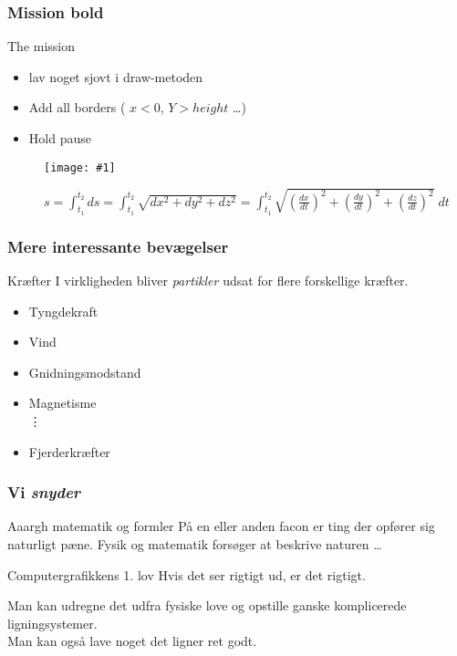 \documentclass{beamer}
\newcommand{\FIGMED}[2]{
  \begin{figure}[]
    \centering
    \texttt{[image: \#1]}
    \caption{#2}
    \label{fig:#1}
  \end{figure}
}
\begin{document}
\begin{frame}
  \frametitle{Mission bold }

  \begin{block}{The mission}
    \begin{itemize}
    \item lav noget sjovt i draw-metoden
    \item Add all borders ( $x < 0$, $Y>height$ \ldots)
    \item Hold pause
    \end{itemize}
  \end{block}
\end{frame}


\begin{frame}[plain]

\FIGMED{curve}{$s =  \int_{t_1}^{t_2} ds =\int_{t_1}^{t_2} \sqrt{dx^2 + dy^2 + dz^2} = \int_{t_1}^{t_2} \sqrt{\left(\frac{dx}{dt}\right)^2 + \left(\frac{dy}{dt}\right)^2 + \left(\frac{dz}{dt}\right)^2}\; dt$}
  
\end{frame}

\begin{frame}
  \frametitle{Mere interessante bevægelser}

  \begin{block}{Kræfter}
    I virkligheden bliver \emph{partikler} udsat for flere forskellige kræfter.
    \begin{itemize}
    \item Tyngdekraft
    \item Vind
    \item Gnidningsmodstand
    \item Magnetisme\\
    \hspace{.3cm}       \vdots
    \item Fjerderkræfter

    \end{itemize}
  \end{block}

\end{frame}


\begin{frame}
  \frametitle{Vi \emph{snyder}}


  \begin{block}{Aaargh matematik og formler}
    På en eller anden facon er ting der opfører sig naturligt pæne. Fysik og matematik forsøger at beskrive naturen \ldots
  \end{block}


  \begin{block}{Computergrafikkens 1. lov}
    Hvis det ser rigtigt ud, er det rigtigt.
  \end{block}



  Man kan udregne det udfra fysiske love og opstille ganske
  komplicerede ligningsystemer. \\
  Man kan også lave noget det ligner ret godt.

  

\end{frame}
\end{document}
